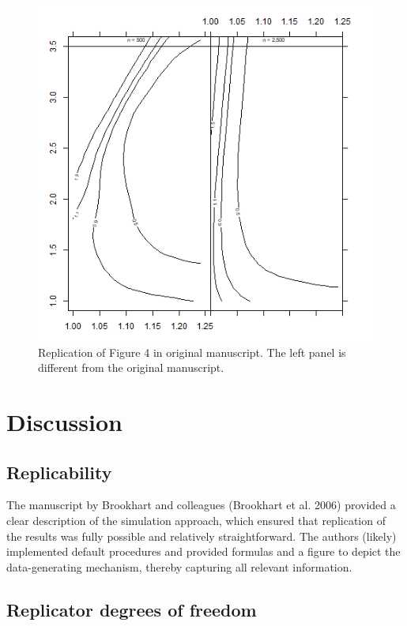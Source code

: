 \documentclass[10,a4paperpaper,]{article}
\begin{document}
\begin{figure}
\includegraphics[width=450pt]{../../figures/Figure4} \caption{Replication of Figure 4 in original manuscript. The left panel is different from the original manuscript.}\label{fig:unnamed-chunk-3}
\end{figure}

\FloatBarrier
\section{Discussion}

\subsection{Replicability}

The manuscript by Brookhart and colleagues (Brookhart et al. 2006)
provided a clear description of the simulation approach, which ensured
that replication of the results was fully possible and relatively
straightforward. The authors (likely) implemented default procedures and
provided formulas and a figure to depict the data-generating mechanism,
thereby capturing all relevant information.

\subsection{Replicator degrees of freedom}
\end{document}
